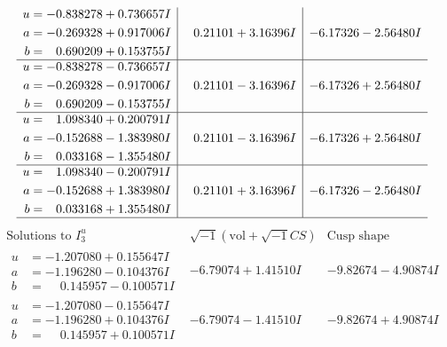 \documentclass[1p]{elsarticle_modified}
\theoremstyle{definition}
\newcommand{\I}{\sqrt{-1}}
\begin{document}
$$\begin{array}{c|c|c}
\begin{aligned}
u &= -0.838278 + 0.736657 I \\
a &= -0.269328 + 0.917006 I \\
b &= \phantom{-}0.690209 + 0.153755 I\end{aligned}
 & \phantom{-}0.21101 + 3.16396 I & -6.17326 - 2.56480 I \\ \hline\begin{aligned}
u &= -0.838278 - 0.736657 I \\
a &= -0.269328 - 0.917006 I \\
b &= \phantom{-}0.690209 - 0.153755 I\end{aligned}
 & \phantom{-}0.21101 - 3.16396 I & -6.17326 + 2.56480 I \\ \hline\begin{aligned}
u &= \phantom{-}1.098340 + 0.200791 I \\
a &= -0.152688 - 1.383980 I \\
b &= \phantom{-}0.033168 - 1.355480 I\end{aligned}
 & \phantom{-}0.21101 - 3.16396 I & -6.17326 + 2.56480 I \\ \hline\begin{aligned}
u &= \phantom{-}1.098340 - 0.200791 I \\
a &= -0.152688 + 1.383980 I \\
b &= \phantom{-}0.033168 + 1.355480 I\end{aligned}
 & \phantom{-}0.21101 + 3.16396 I & -6.17326 - 2.56480 I\\
 \hline 
 \end{array}$$\newpage$$\begin{array}{c|c|c}  
\text{Solutions to }I^u_{3}& \I (\text{vol} + \sqrt{-1}CS) & \text{Cusp shape}\\
 \hline 
\begin{aligned}
u &= -1.207080 + 0.155647 I \\
a &= -1.196280 - 0.104376 I \\
b &= \phantom{-}0.145957 - 0.100571 I\end{aligned}
 & -6.79074 + 1.41510 I & -9.82674 - 4.90874 I \\ \hline\begin{aligned}
u &= -1.207080 - 0.155647 I \\
a &= -1.196280 + 0.104376 I \\
b &= \phantom{-}0.145957 + 0.100571 I\end{aligned}
 & -6.79074 - 1.41510 I & -9.82674 + 4.90874 I \\ \hline\begin{aligned}

\end{aligned}
\end{array}$$
\end{document}
